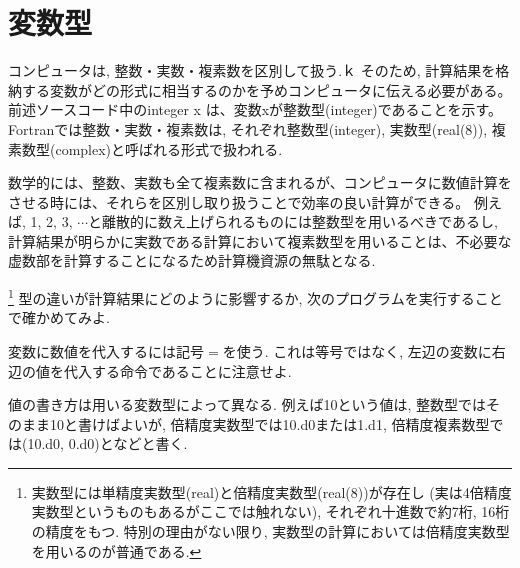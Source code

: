 \documentclass[a4j]{jsbook}
\begin{document}
\section{変数型}
コンピュータは, 整数・実数・複素数を区別して扱う.ｋ
そのため, 計算結果を格納する変数がどの形式に相当するのかを予めコンピュータに伝える必要がある。
前述ソースコード中の{\ttfamily integer x} は、変数{\ttfamily x}が整数型(integer)であることを示す。
Fortranでは整数・実数・複素数は, それぞれ整数型(integer), 実数型(real(8)), 複素数型(complex)と呼ばれる形式で扱われる.

数学的には、整数、実数も全て複素数に含まれるが、コンピュータに数値計算をさせる時には、それらを区別し取り扱うことで効率の良い計算ができる。
例えば, 1, 2, 3, $\cdots$と離散的に数え上げられるものには整数型を用いるべきであるし, 
計算結果が明らかに実数である計算において複素数型を用いることは、不必要な虚数部を計算することになるため計算機資源の無駄となる. 

\footnote{実数型には単精度実数型(real)と倍精度実数型(real(8))が存在し
(実は4倍精度実数型というものもあるがここでは触れない), 
それぞれ十進数で約7桁, 16桁の精度をもつ. 
特別の理由がない限り, 実数型の計算においては倍精度実数型を用いるのが普通である. 
}
型の違いが計算結果にどのように影響するか, 次のプログラムを実行することで確かめてみよ. 

変数に数値を代入するには記号$=$を使う. 
これは等号ではなく, 左辺の変数に右辺の値を代入する命令であることに注意せよ. 

値の書き方は用いる変数型によって異なる. 
例えば10という値は, 整数型ではそのまま10と書けばよいが, 
倍精度実数型では10.d0または1.d1, 倍精度複素数型では(10.d0, 0.d0)となどと書く. \\

\end{document}
